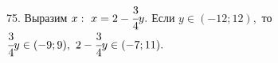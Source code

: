 75. Выразим $x:\ x=2-\cfrac{3}{4}y.$ Если $y\in(-12;12),$ то $\cfrac{3}{4}y\in (-9;9),\ 2-\cfrac{3}{4}y\in (-7;11).$\\

